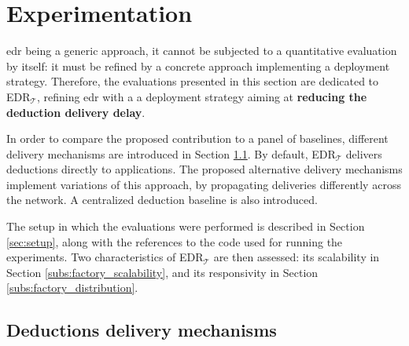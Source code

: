 \documentclass{iosart2c}
\newcommand{\edrt}{EDR$_{\mathcal{T}}$\xspace}
\begin{document}
\section{Experimentation}
\label{sec:experimentations}
\gls{edr} being a generic approach, it cannot be subjected to a quantitative evaluation by itself: it must be refined by a concrete approach implementing a deployment strategy. 
Therefore, the evaluations presented in this section are dedicated to \edrt, refining \gls{edr} with a a deployment strategy aiming at \textbf{reducing the deduction delivery delay}.

In order to compare the proposed contribution to a panel of baselines, different delivery mechanisms are introduced in Section \textsection \ref{sec:deductions_propagation_strategies}. 
By default, \edrt delivers deductions directly to applications. 
The proposed alternative delivery mechanisms implement variations of this approach, by propagating deliveries differently across the network.
A centralized deduction baseline is also introduced.

The setup in which the evaluations were performed is described in Section \textsection \ref{sec:setup}, along with the references to the code used for running the experiments.
Two characteristics of \edrt are then assessed: its scalability in Section \textsection\ref{subs:factory_scalability}, and its responsivity in Section \textsection\ref{subs:factory_distribution}.

\subsection{Deductions delivery mechanisms}
\label{sec:deductions_propagation_strategies}
\end{document}
